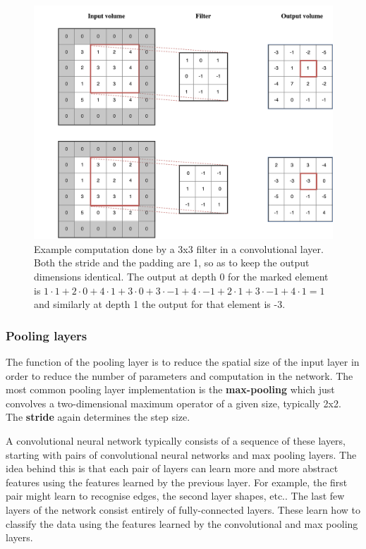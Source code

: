 \documentclass[12pt,a4paper,twoside,openright]{report}
\begin{document}
\begin{figure}[h]
	\centering
	\includegraphics[scale=0.6]{conv_example}
	\caption[Example computation done by a 3x3 filter in a convolutional layer]{Example computation done by a 3x3 filter in a convolutional layer. Both the stride and the padding are 1, so as to keep the output dimensions identical. The output at depth 0 for the marked element is $1 \cdot 1 + 2 \cdot 0 + 4 \cdot 1 + 3 \cdot 0 + 3 \cdot -1 + 4 \cdot -1 + 2 \cdot 1 + 3 \cdot -1 + 4 \cdot 1 = 1$ and similarly at depth 1 the output for that element is -3.}
	\label{fig:conv_example}
\end{figure}

\subsubsection{Pooling layers}
The function of the pooling layer is to reduce the spatial size of the input layer in order to reduce the number of parameters and computation in the network. The most common pooling layer implementation is the \textbf{max-pooling} which just convolves a two-dimensional maximum operator of a given size, typically 2x2. The \textbf{stride} again determines the step size.
\newline

A convolutional neural network typically consists of a sequence of these layers, starting with pairs of convolutional neural networks and max pooling layers. The idea behind this is that each pair of layers can learn more and more abstract features using the features learned by the previous layer. For example, the first pair might learn to recognise edges, the second layer shapes, etc.. The last few layers of the network consist entirely of fully-connected layers. These learn how to classify the data using the features learned by the convolutional and max pooling layers.
\end{document}
